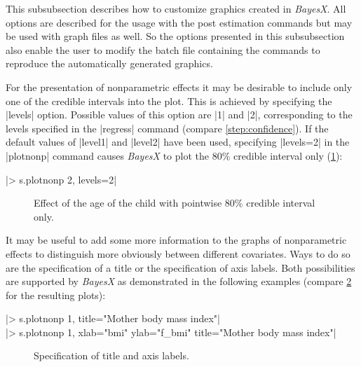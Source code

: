 This subsubsection describes how to customize graphics created in {\it BayesX}. All options are described for the usage with
the post estimation commands but may be used with graph files as well. So the options presented in this subsubsection also
enable the user to modify the batch file containing the commands to reproduce the automatically generated graphics.

For the presentation of nonparametric effects it may be desirable to include only one of the credible intervals into the plot.
This is achieved by specifying the |levels| option. Possible values of this option are |1| and |2|, corresponding to the levels
specified in the |regress| command (compare \ref{step:confidence}). If the default values of |level1| and |level2| have been
used, specifying |levels=2| in the |plotnonp| command causes {\it BayesX} to plot the 80\% credible interval only
(\ref{step:agc3}):

|> s.plotnonp 2, levels=2|

\begin{figure}[ht]
\begin{center}
{\it\caption{Effect of the age of the child with pointwise 80\%
credible interval only.\label{step:agc3}}}
\end{center}
\end{figure}

It may be useful to add some more information to the graphs of nonparametric effects to distinguish more obviously between
different covariates. Ways to do so are the specification of a title or the specification of axis labels. Both possibilities
are supported by {\it BayesX} as demonstrated in the following examples (compare \ref{step:bmi4} for the resulting plots):

 |> s.plotnonp 1, title="Mother body mass index"|\\
 |> s.plotnonp 1, xlab="bmi" ylab="f_bmi" title="Mother body mass index"|

\begin{figure}[ht]
\begin{center}
\begin{multicols}{2}
\end{multicols}
{\it\caption{Specification of title and axis
labels.\label{step:bmi4}}}
\end{center}
\end{figure}

